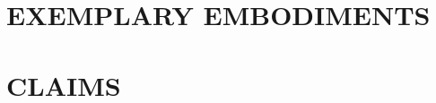 \documentclass[12pt,letterpaper]{article}
\begin{document}
%
%
%
%
%
%
%

\section*{EXEMPLARY EMBODIMENTS}

%
%
%
%
%
%

\newpage
\section*{CLAIMS}
\end{document}
